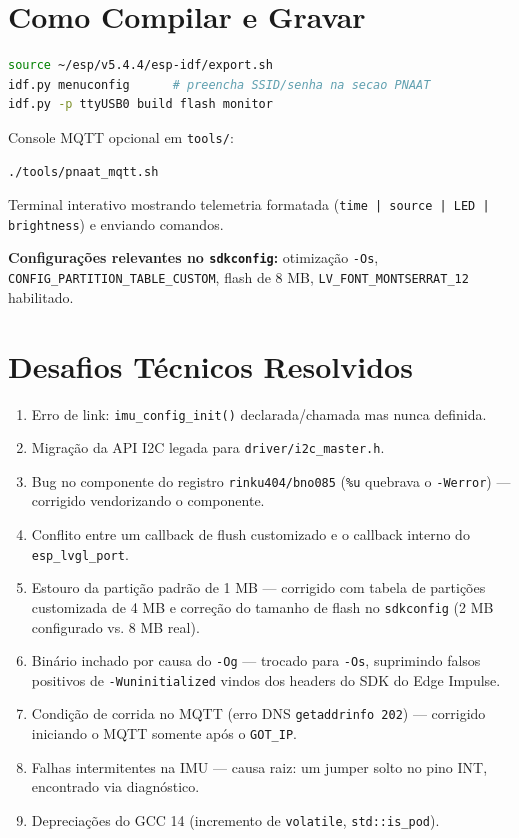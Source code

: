 \documentclass[11pt,a4paper]{article}
\begin{document}
\section{Como Compilar e Gravar}

\begin{lstlisting}[language=bash,caption={Compilação e gravação}]
source ~/esp/v5.4.4/esp-idf/export.sh
idf.py menuconfig      # preencha SSID/senha na secao PNAAT
idf.py -p ttyUSB0 build flash monitor
\end{lstlisting}

Console MQTT opcional em \texttt{tools/}:

\begin{lstlisting}[language=bash]
./tools/pnaat_mqtt.sh
\end{lstlisting}

Terminal interativo mostrando telemetria formatada (\texttt{time | source | LED | brightness}) e enviando comandos.

\textbf{Configurações relevantes no \texttt{sdkconfig}:} otimização \texttt{-Os}, \texttt{CONFIG\_PARTITION\_TABLE\_CUSTOM}, flash de 8 MB, \texttt{LV\_FONT\_MONTSERRAT\_12} habilitado.


\section{Desafios Técnicos Resolvidos}

\begin{enumerate}[leftmargin=*]
    \item Erro de link: \texttt{imu\_config\_init()} declarada/chamada mas nunca definida.
    \item Migração da API I2C legada para \texttt{driver/i2c\_master.h}.
    \item Bug no componente do registro \texttt{rinku404/bno085} (\texttt{\%u} quebrava o \texttt{-Werror}) — corrigido vendorizando o componente.
    \item Conflito entre um callback de flush customizado e o callback interno do \texttt{esp\_lvgl\_port}.
    \item Estouro da partição padrão de 1 MB — corrigido com tabela de partições customizada de 4 MB e correção do tamanho de flash no \texttt{sdkconfig} (2 MB configurado vs. 8 MB real).
    \item Binário inchado por causa do \texttt{-Og} — trocado para \texttt{-Os}, suprimindo falsos positivos de \texttt{-Wuninitialized} vindos dos headers do SDK do Edge Impulse.
    \item Condição de corrida no MQTT (erro DNS \texttt{getaddrinfo 202}) — corrigido iniciando o MQTT somente após o \texttt{GOT\_IP}.
    \item Falhas intermitentes na IMU — causa raiz: um jumper solto no pino INT, encontrado via diagnóstico.
    \item Depreciações do GCC 14 (incremento de \texttt{volatile}, \texttt{std::is\_pod}).
\end{enumerate}
\end{document}
